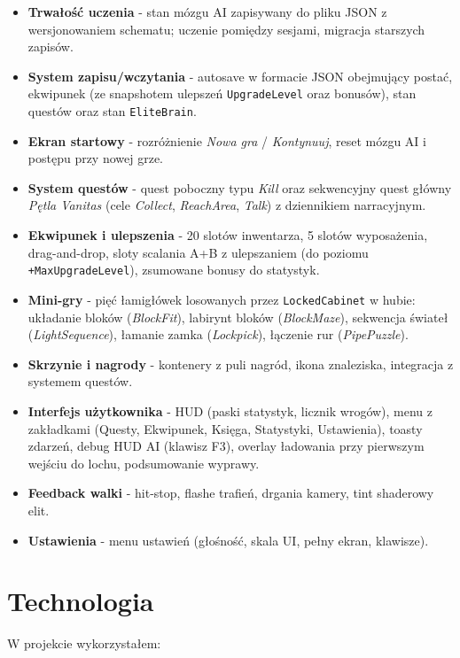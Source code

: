 \begin{itemize}
    \item \textbf{Trwałość uczenia} - stan mózgu AI zapisywany do pliku JSON z wersjonowaniem schematu; uczenie pomiędzy sesjami, migracja starszych zapisów.
    \item \textbf{System zapisu/wczytania} - autosave w formacie JSON obejmujący postać, ekwipunek (ze snapshotem ulepszeń \texttt{UpgradeLevel} oraz bonusów), stan questów oraz stan \texttt{EliteBrain}.
    \item \textbf{Ekran startowy} - rozróżnienie \textit{Nowa gra} / \textit{Kontynuuj}, reset mózgu AI i postępu przy nowej grze.
    \item \textbf{System questów} - quest poboczny typu \textit{Kill} oraz sekwencyjny quest główny \textit{Pętla Vanitas} (cele \textit{Collect}, \textit{ReachArea}, \textit{Talk}) z dziennikiem narracyjnym.
    \item \textbf{Ekwipunek i ulepszenia} - 20 slotów inwentarza, 5 slotów wyposażenia, drag-and-drop, sloty scalania A+B z ulepszaniem (do poziomu \texttt{+MaxUpgradeLevel}), zsumowane bonusy do statystyk.
    \item \textbf{Mini-gry} - pięć łamigłówek losowanych przez \texttt{LockedCabinet} w hubie: układanie bloków (\textit{BlockFit}), labirynt bloków (\textit{BlockMaze}), sekwencja świateł (\textit{LightSequence}), łamanie zamka (\textit{Lockpick}), łączenie rur (\textit{PipePuzzle}).
    \item \textbf{Skrzynie i nagrody} - kontenery z puli nagród, ikona znaleziska, integracja z systemem questów.
    \item \textbf{Interfejs użytkownika} - HUD (paski statystyk, licznik wrogów), menu z zakładkami (Questy, Ekwipunek, Księga, Statystyki, Ustawienia), toasty zdarzeń, debug HUD AI (klawisz F3), overlay ładowania przy pierwszym wejściu do lochu, podsumowanie wyprawy.
    \item \textbf{Feedback walki} - hit-stop, flashe trafień, drgania kamery, tint shaderowy elit.
    \item \textbf{Ustawienia} - menu ustawień (głośność, skala UI, pełny ekran, klawisze).
\end{itemize}

\section{Technologia}

W projekcie wykorzystałem:

